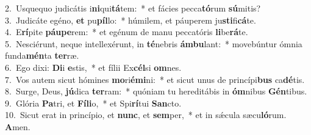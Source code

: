 {2.~}Usquequo judicátis i\textbf{ni}qui\textbf{tá}tem:~* et fácies pecca\textbf{tó}rum \textbf{sú}mitis?\\
{3.~}Judicáte egéno, \textbf{et} pu\textbf{píl}lo:~* húmilem, et páuperem ju\textbf{sti}fi\textbf{cá}te.\\
{4.~}E\textbf{rí}pite \textbf{páu}\textbf{pe}rem:~* et egénum de manu peccatóris \textbf{li}be\textbf{rá}te.\\
{5.~}Nesciérunt, neque intellexérunt, in \textbf{té}nebris \textbf{ám}\textbf{bu}lant:~* movebúntur ómnia funda\textbf{mén}ta \textbf{ter}ræ.\\
{6.~}Ego dixi: \textbf{Di}i \textbf{e}stis,~* et fílii Ex\textbf{cél}si \textbf{om}nes.\\
{7.~}Vos autem sicut hómines \textbf{mo}ri\textbf{é}\textbf{mi}ni:~* et sicut unus de princípi\textbf{bus} ca\textbf{dé}tis.\\
{8.~}Surge, Deus, \textbf{jú}dica \textbf{ter}ram:~* quóniam tu hereditábis in \textbf{óm}nibus \textbf{Gén}tibus.\\
{9.~}Glória \textbf{Pa}tri, et \textbf{Fí}\textbf{li}o,~* et Spi\textbf{rí}tui \textbf{San}cto.\\
{10.~}Sicut erat in princípio, et \textbf{nunc}, et \textbf{sem}per,~* et in sǽcula sæcu\textbf{ló}rum. \textbf{A}men.\\
